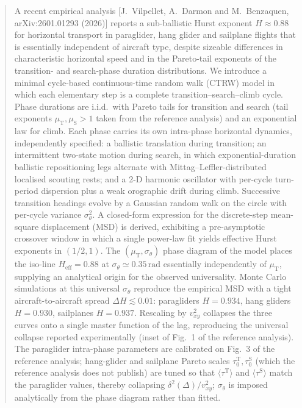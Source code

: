 \documentclass[11pt,a4paper]{article}
\begin{document}
\begin{abstract}
A recent empirical analysis [J.\ Vilpellet, A.\ Darmon and
M.\ Benzaquen, arXiv:2601.01293 (2026)] reports a sub-ballistic
Hurst exponent $H \approx 0.88$ for horizontal transport in
paraglider, hang glider and sailplane flights that is essentially
independent of aircraft type, despite sizeable differences in
characteristic horizontal speed and in the Pareto-tail exponents
of the transition- and search-phase duration distributions. We
introduce a minimal cycle-based continuous-time random walk
(CTRW) model in which each elementary step is a complete
transition--search--climb cycle. Phase durations are i.i.d.\ with
Pareto tails for transition and search (tail exponents
$\mu_{\mathrm{T}},\mu_{\mathrm{S}}>1$ taken from the reference
analysis) and an exponential law for climb. Each phase carries
its own intra-phase horizontal dynamics, independently specified:
a ballistic translation during transition; an intermittent
two-state motion during search, in which exponential-duration
ballistic repositioning legs alternate with
Mittag--Leffler-distributed localised scouting rests; and a 2-D
harmonic oscillator with per-cycle turn-period dispersion plus a
weak orographic drift during climb. Successive transition
headings evolve by a Gaussian random walk on the circle with
per-cycle variance $\sigma_\theta^2$. A closed-form expression
for the discrete-step mean-square displacement (MSD) is derived,
exhibiting a pre-asymptotic crossover window in which a single
power-law fit yields effective Hurst exponents in $(1/2,1)$. The
$(\mu_{\mathrm{T}},\sigma_\theta)$ phase diagram of the model
places the iso-line $H_{\mathrm{eff}}=0.88$ at $\sigma_\theta
\simeq 0.35\,\mathrm{rad}$ essentially independently of
$\mu_{\mathrm{T}}$, supplying an analytical origin for the
observed universality. Monte Carlo simulations at this
universal $\sigma_\theta$ reproduce the empirical MSD with a
tight aircraft-to-aircraft spread $\Delta H \lesssim 0.01$:
paragliders $H=0.934$, hang gliders $H=0.930$, sailplanes
$H=0.937$. Rescaling by $v_{xy}^2$ collapses the three curves
onto a single master function of the lag, reproducing the
universal collapse reported experimentally (inset of
Fig.~1 of the reference analysis). The paraglider intra-phase
parameters are calibrated on Fig.~3 of the reference analysis;
hang-glider and sailplane Pareto scales $\tau_0^{\mathrm{T}},
\tau_0^{\mathrm{S}}$ (which the reference analysis does not
publish) are tuned so that $\langle\tau^{\mathrm{T}}\rangle$
and $\langle\tau^{\mathrm{S}}\rangle$ match the paraglider
values, thereby collapsing $\delta^2(\Delta)/v_{xy}^2$;
$\sigma_\theta$ is imposed analytically from the phase diagram
rather than fitted.
\end{abstract}
\end{document}
